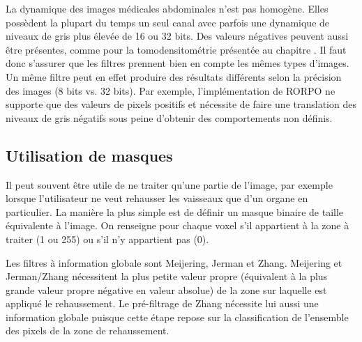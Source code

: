 La dynamique des images médicales abdominales n'est pas homogène. Elles possèdent la plupart du temps un seul canal avec parfois une dynamique de niveaux de gris plus élevée de 16 ou 32 bits. Des valeurs négatives peuvent aussi être présentes, comme pour la tomodensitométrie présentée au chapitre \chapContextN. Il faut donc s'assurer que les filtres prennent bien en compte les mêmes types d’images. Un même filtre peut en effet produire des résultats différents selon la précision des images (8 bits vs. 32 bits). Par exemple, l'implémentation de RORPO ne supporte que des valeurs de pixels positifs et nécessite de faire une translation des niveaux de gris négatifs sous peine d'obtenir des comportements non définis.

\subsection{Utilisation de masques}

Il peut souvent être utile de ne traiter qu'une partie de l'image, par exemple lorsque l'utilisateur ne veut rehausser les vaisseaux que d'un organe en particulier. La manière la plus simple est de définir un masque binaire de taille équivalente à l'image. On renseigne pour chaque voxel s'il appartient à la zone à traiter (1 ou 255) ou s'il n'y appartient pas (0). 



Les filtres à information globale sont Meijering, Jerman et Zhang. Meijering et Jerman/Zhang nécessitent la plus petite valeur propre (équivalent à la plus grande valeur propre négative en valeur absolue) de la zone sur laquelle est appliqué le rehaussement. Le pré-filtrage de Zhang nécessite lui aussi une information globale puisque cette étape repose sur la classification de l'ensemble des pixels de la zone de rehaussement.

